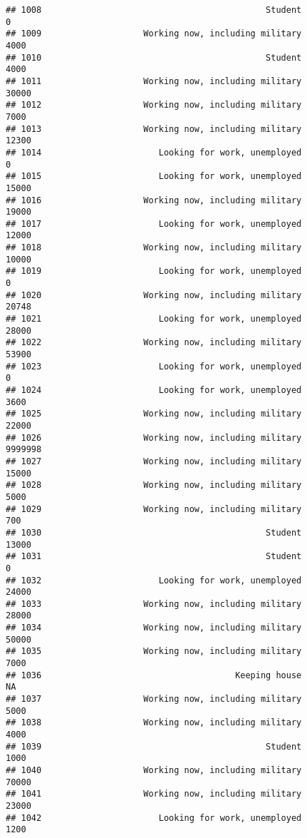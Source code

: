 \documentclass[]{book}
\theoremstyle{definition}
\theoremstyle{definition}
\theoremstyle{remark}
\begin{document}
\begin{verbatim}
## 1008                                            Student               0
## 1009                    Working now, including military            4000
## 1010                                            Student            4000
## 1011                    Working now, including military           30000
## 1012                    Working now, including military            7000
## 1013                    Working now, including military           12300
## 1014                       Looking for work, unemployed               0
## 1015                       Looking for work, unemployed           15000
## 1016                    Working now, including military           19000
## 1017                       Looking for work, unemployed           12000
## 1018                    Working now, including military           10000
## 1019                       Looking for work, unemployed               0
## 1020                    Working now, including military           20748
## 1021                       Looking for work, unemployed           28000
## 1022                    Working now, including military           53900
## 1023                       Looking for work, unemployed               0
## 1024                       Looking for work, unemployed            3600
## 1025                    Working now, including military           22000
## 1026                    Working now, including military         9999998
## 1027                    Working now, including military           15000
## 1028                    Working now, including military            5000
## 1029                    Working now, including military             700
## 1030                                            Student           13000
## 1031                                            Student               0
## 1032                       Looking for work, unemployed           24000
## 1033                    Working now, including military           28000
## 1034                    Working now, including military           50000
## 1035                    Working now, including military            7000
## 1036                                      Keeping house              NA
## 1037                    Working now, including military            5000
## 1038                    Working now, including military            4000
## 1039                                            Student            1000
## 1040                    Working now, including military           70000
## 1041                    Working now, including military           23000
## 1042                       Looking for work, unemployed            1200

\end{verbatim}
\end{document}
